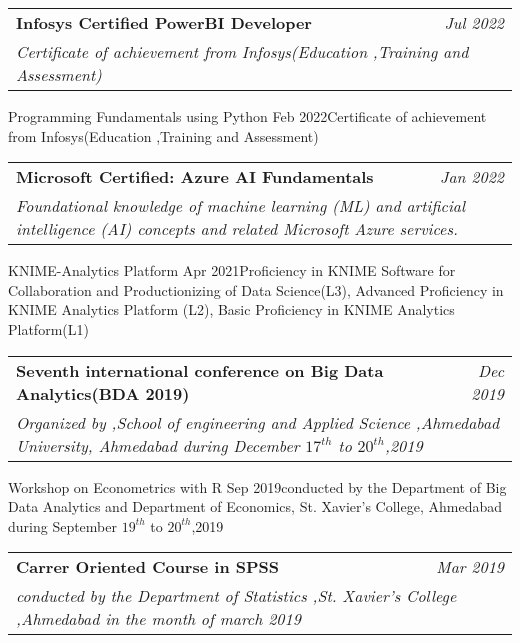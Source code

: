 \documentclass[letterpaper,11pt]{article}
\makeatletter
\newcommand{\resumeOrganizationHeading}[4]{
  \vspace{-2pt}\item
    \begin{tabular*}{0.97\textwidth}[t]{l@{\extracolsep{\fill}}r}
      \textbf{#1} & \textit{\small #2} \\
      \multicolumn{2}{p{0.97\textwidth}}{\raggedright\textit{\small #3}}\\[-5pt]

    \end{tabular*}\vspace{-7pt}
}
\newcommand{\resumeSubHeadingListEnd}{\end{itemize}}
\makeatother
\begin{document}
    \resumeOrganizationHeading
      {Infosys Certified PowerBI Developer \href{https://www.credly.com/badges/95150e89-26aa-4e4c-897d-bcd3484ffcfa/public_url}{\raisebox{-0.1\height}\faExternalLink }}{Jul 2022}{Certificate of achievement from Infosys(Education ,Training and Assessment)}

    \resumeOrganizationHeading
      {Programming Fundamentals using Python \href{https://www.linkedin.com/in/kashyap-gohil/details/certifications/}{\raisebox{-0.1\height}\faExternalLink }}{Feb 2022}{Certificate of achievement from Infosys(Education ,Training and Assessment)}

    \resumeOrganizationHeading
       {Microsoft Certified: Azure AI Fundamentals \href{https://www.credly.com/badges/95150e89-26aa-4e4c-897d-bcd3484ffcfa/public_url}{\raisebox{-0.1\height}\faExternalLink }}{Jan 2022}{Foundational knowledge of machine learning (ML) and artificial intelligence (AI) concepts and related Microsoft Azure services.} 
      
    \resumeOrganizationHeading
      {KNIME-Analytics Platform \href{https://www.credly.com/badges/95150e89-26aa-4e4c-897d-bcd3484ffcfa/public_url}{\raisebox{-0.1\height}\faExternalLink }}{Apr 2021}{Proficiency in KNIME Software for Collaboration and Productionizing of Data Science(L3), Advanced Proficiency in KNIME Analytics Platform (L2), Basic Proficiency in KNIME Analytics Platform(L1)}
      
    \resumeOrganizationHeading
      {Seventh international conference on Big Data Analytics(BDA 2019) \href{https://www.credly.com/badges/95150e89-26aa-4e4c-897d-bcd3484ffcfa/public_url}{\raisebox{-0.1\height}\faExternalLink }}{Dec 2019}{Organized by ,School of engineering and Applied Science ,Ahmedabad University, Ahmedabad during December $17^{th}$ to $20^{th}$,2019}      

    \resumeOrganizationHeading
      {Workshop on Econometrics with R }{Sep 2019}{conducted by the Department of Big Data Analytics and Department of Economics, St. Xavier's College, Ahmedabad during September $19^{th}$ to $20^{th}$,2019}   
      
    \resumeOrganizationHeading
      {Carrer Oriented Course in SPSS \href{https://www.credly.com/badges/95150e89-26aa-4e4c-897d-bcd3484ffcfa/public_url}{\raisebox{-0.1\height}\faExternalLink }}{Mar 2019}{conducted by the Department of Statistics ,St. Xavier's College ,Ahmedabad in the month of march 2019}     
  \resumeSubHeadingListEnd

\end{document}
